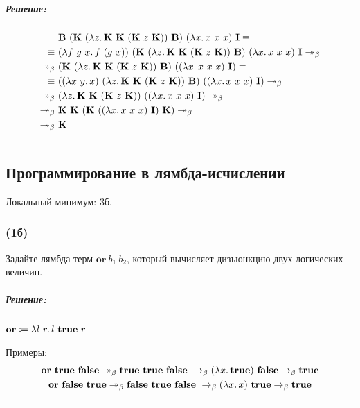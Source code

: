 \documentclass{article}
\newenvironment{proof}{\subparagraph{\hspace{-1em}Решение:\newline}\-}{\par\noindent\rule{\textwidth}{0.4pt}}
\newcommand{\comb}[1]{\mathbf{#1}}
\newcommand{\betastep}{\rightarrow_\beta}
\newcommand{\betasteps}{\twoheadrightarrow_\beta}
\begin{document}
    \begin{proof}
        \begin{align}
            & \comb{B}~(\comb{K}~(\lambda z\ldotp \comb{K}~\comb{K}~(\comb{K}~z~\comb{K}))~\comb{B})~(\lambda x\ldotp x~x~x)~\comb{I} \equiv \\
            \equiv~ & (\lambda f~g~x\ldotp f~(g~x))~(\comb{K}~(\lambda z\ldotp \comb{K}~\comb{K}~(\comb{K}~z~\comb{K}))~\comb{B})~(\lambda x\ldotp x~x~x)~\comb{I} \betasteps \\
            \betasteps~ & (\comb{K}~(\lambda z\ldotp \comb{K}~\comb{K}~(\comb{K}~z~\comb{K}))~\comb{B})~((\lambda x\ldotp x~x~x)~\comb{I}) \equiv \\
            \equiv~ & ((\lambda x~y\ldotp x)~(\lambda z\ldotp \comb{K}~\comb{K}~(\comb{K}~z~\comb{K}))~\comb{B})~((\lambda x\ldotp x~x~x)~\comb{I}) \betasteps \\
            \betasteps~ & (\lambda z\ldotp \comb{K}~\comb{K}~(\comb{K}~z~\comb{K}))~((\lambda x\ldotp x~x~x)~\comb{I}) \betasteps~ \\
            \betasteps~ & \comb{K}~\comb{K}~(\comb{K}~((\lambda x\ldotp x~x~x)~\comb{I})~\comb{K}) \betasteps~ \\
            \betasteps~ & \comb{K}
        \end{align}
    \end{proof}

    \subsection{Программирование в лямбда-исчислении}

    Локальный минимум: 3б.

    \subsubsection{(1б)}

    Задайте лямбда-терм $\textbf{or}~b_1~b_2$, который вычисляет дизъюнкцию двух логических величин.

    \begin{proof}
        \(\textbf{or} \coloneqq \lambda l~r\ldotp l~\textbf{true}~r\)

        Примеры:
        \begin{gather}
            \textbf{or}~\textbf{true}~\textbf{false} \betasteps\textbf{true}~\textbf{true}~\textbf{false}~\betastep(\lambda x\ldotp \textbf{true})~\textbf{false} \betastep\textbf{true} \\
            \textbf{or}~\textbf{false}~\textbf{true} \betasteps\textbf{false}~\textbf{true}~\textbf{false}~\betastep(\lambda x\ldotp x)~\textbf{true} \betastep\textbf{true}
        \end{gather}
    \end{proof}
\end{document}

